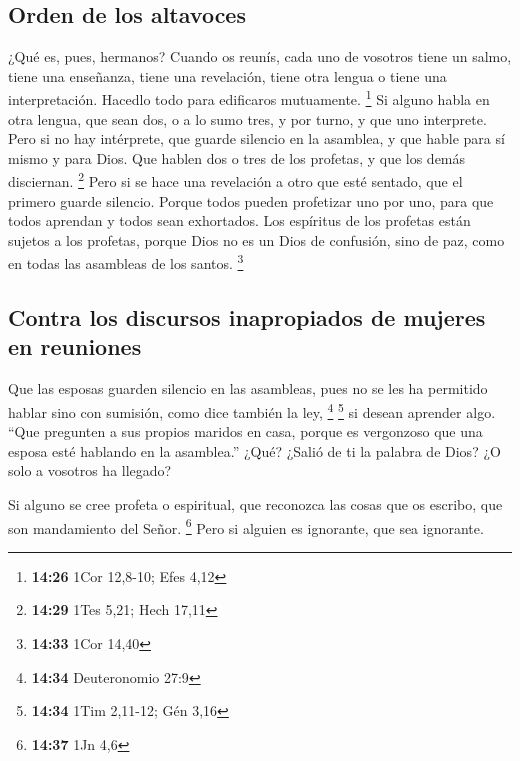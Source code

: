 \begin{paracol}{2}
\hypertarget{orden-de-los-altavoces}{%
\subsection{Orden de los altavoces}\label{orden-de-los-altavoces}}

 ¿Qué es, pues, hermanos? Cuando os reunís, cada uno de
vosotros tiene un salmo, tiene una enseñanza, tiene una revelación,
tiene otra lengua o tiene una interpretación. Hacedlo todo para
edificaros mutuamente. \footnote{\textbf{14:26} 1Cor 12,8-10; Efes 4,12}
 Si alguno habla en otra lengua, que sean dos, o a lo
sumo tres, y por turno, y que uno interprete.  Pero si no
hay intérprete, que guarde silencio en la asamblea, y que hable para sí
mismo y para Dios.  Que hablen dos o tres de los
profetas, y que los demás disciernan. \footnote{\textbf{14:29} 1Tes
  5,21; Hech 17,11}  Pero si se hace una revelación a
otro que esté sentado, que el primero guarde silencio. 
Porque todos pueden profetizar uno por uno, para que todos aprendan y
todos sean exhortados.  Los espíritus de los profetas
están sujetos a los profetas,  porque Dios no es un Dios
de confusión, sino de paz, como en todas las asambleas de los santos.
\footnote{\textbf{14:33} 1Cor 14,40}

\hypertarget{contra-los-discursos-inapropiados-de-mujeres-en-reuniones}{%
\subsection{Contra los discursos inapropiados de mujeres en
reuniones}\label{contra-los-discursos-inapropiados-de-mujeres-en-reuniones}}

 Que las esposas guarden silencio en las asambleas, pues
no se les ha permitido hablar sino con sumisión, como dice también la
ley, \footnote{\textbf{14:34} Deuteronomio 27:9} \footnote{\textbf{14:34}
  1Tim 2,11-12; Gén 3,16}  si desean aprender algo. ``Que
pregunten a sus propios maridos en casa, porque es vergonzoso que una
esposa esté hablando en la asamblea.''  ¿Qué? ¿Salió de
ti la palabra de Dios? ¿O solo a vosotros ha llegado?

 Si alguno se cree profeta o espiritual, que reconozca
las cosas que os escribo, que son mandamiento del Señor. \footnote{\textbf{14:37}
  1Jn 4,6}  Pero si alguien es ignorante, que sea
ignorante.


\end{paracol}
